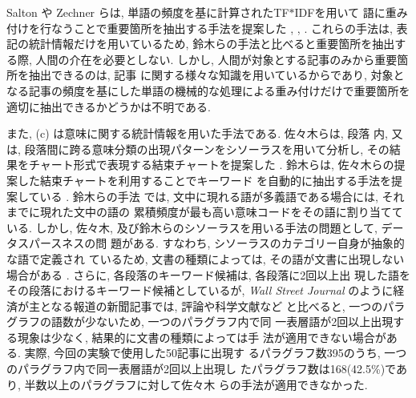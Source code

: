 Salton や Zechner らは, 単語の頻度を基に計算されたTF$\ast$IDFを用いて
語に重み付けを行なうことで重要箇所を抽出する手法を提案した
\cite{Salton1993}, \cite{Salton1994},
\cite{Zechner1996}.  これらの手法は, 表記の統計情報だけを用いているため, 
鈴木らの手法と比べると重要箇所を抽出する際, 人間の介在を必要としない.
しかし, 人間が対象とする記事のみから重要箇所を抽出できるのは, 記事
に関する様々な知識を用いているからであり, 対象となる記事の頻度を基にした単語の機械的な処理による重み付けだけで重要箇所を適切に抽出できるかどうかは不明である.


また, (c) は意味に関する統計情報を用いた手法である.  佐々木らは, 段落
内, 又は, 段落間に跨る意味分類の出現パターンをシソーラスを用いて分析し, 
その結果をチャート形式で表現する結束チャートを提案した
\cite{Sasaki1993}.  鈴木らは, 佐々木らの提案した結束チャートを利用することでキーワード
を自動的に抽出する手法を提案している \cite{Suzuki1993}.  鈴木らの手法
では, 文中に現れる語が多義語である場合には, それまでに現れた文中の語の
累積頻度が最も高い意味コードをその語に割り当てている.  しかし, 佐々木, 
及び鈴木らのシソーラスを用いる手法の問題として, データスパースネスの問
題がある.  すなわち, シソーラスのカテゴリー自身が抽象的な語で定義され
ているため, 文書の種類によっては, その語が文書に出現しない場合がある
\cite{Niwa1995}.  さらに, 各段落のキーワード候補は, 各段落に2回以上出
現した語をその段落におけるキーワード候補としているが, {\it Wall Street
Journal} のように経済が主となる報道の新聞記事では, 評論や科学文献など
と比べると, 一つのパラグラフの語数が少ないため, 一つのパラグラフ内で同
一表層語が2回以上出現する現象は少なく, 結果的に文書の種類によっては手
法が適用できない場合がある.  実際, 今回の実験で使用した50記事に出現す
るパラグラフ数395のうち, 一つのパラグラフ内で同一表層語が2回以上出現し
たパラグラフ数は168(42.5\%)であり, 半数以上のパラグラフに対して佐々木
らの手法が適用できなかった.
 


